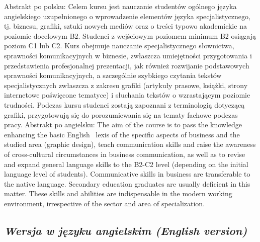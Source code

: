 \documentclass[12pt, a4paper]{article}
\begin{document}
Abstrakt po polsku: Celem kursu jest nauczanie studentów ogólnego języka angielskiego uzupełnionego o wprowadzenie elementów języka specjalistycznego, tj. biznesu, grafiki, sztuki nowych mediów oraz o treści typowo akademickie na poziomie docelowym B2. Studenci z wejściowym poziomem minimum B2 osiągają poziom C1 lub C2. Kurs obejmuje nauczanie specjalistycznego słownictwa, sprawności komunikacyjnych w biznesie, zwłaszcza umiejętności przygotowania i przedstawienia profesjonalnej prezentacji, jak również rozwijanie podstawowych sprawności komunikacyjnych, a szczególnie szybkiego czytania tekstów specjalistycznych zwłaszcza z zakresu grafiki (artykuły prasowe, książki, strony internetowe poświęcone tematyce) i słuchania tekstów o wzrastającym poziomie trudności. Podczas kursu studenci zostają zapoznani z terminologią dotyczącą grafiki, przygotowują się do porozumiewania się na tematy fachowe podczas pracy. Abstrakt po angielsku: The aim of the course is to pass the knowledge enhancing the basic English  lexis of the specific aspects of business and the studied area (graphic design), teach communication skills and raise the awareness of cross-cultural circumstances in business communication, as well as to revise and expand general language skills to the B2-C2 level (depending on the initial language level of students). Communicative skills in business are transferable to the native language. Secondary education graduates are usually deficient in this matter. These skills and abilities are indispensable in the modern working environment, irrespective of the sector and area of specialization.

\subsection*{\textit{Wersja w języku angielskim (English version)}}
\end{document}

